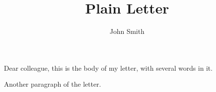 \documentclass{article}
\title{Plain Letter}
\author{John Smith}
\begin{document}
Dear colleague, this is the body of my letter, with several words in it.

Another paragraph of the letter.

\noindent\@author
\end{document}
